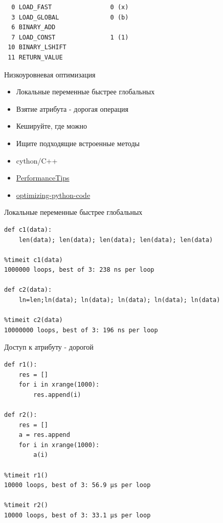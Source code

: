 \documentclass{article}
\begin{document}
\begin{verbatim}
  0 LOAD_FAST                0 (x)
  3 LOAD_GLOBAL              0 (b)
  6 BINARY_ADD          
  7 LOAD_CONST               1 (1)
 10 BINARY_LSHIFT       
 11 RETURN_VALUE   
\end{verbatim}
\newpage 

\begin{center} Низкоуровневая оптимизация \end{center}
\begin{itemize}
    \item Локальные переменные быстрее глобальных
    \item Взятие атрибута - дорогая операция
    \item Кешируйте, где можно
    \item Ищите подходящие встроенные методы
    \item cython/C++
    \item \href{https://wiki.python.org/moin/PythonSpeed/PerformanceTips}{PerformanceTips}
    \item \href{http://stackoverflow.com/questions/7165465/optimizing-python-code}{optimizing-python-code}
\end{itemize}
\newpage 

\begin{center} Локальные переменные быстрее глобальных \end{center}
\begin{verbatim}
def c1(data):                              
    len(data); len(data); len(data); len(data); len(data)

%timeit c1(data)
1000000 loops, best of 3: 238 ns per loop

def c2(data):                              
    ln=len;ln(data); ln(data); ln(data); ln(data); ln(data)

%timeit c2(data)
10000000 loops, best of 3: 196 ns per loop
\end{verbatim}
\newpage 

\begin{center} Доступ к атрибуту - дорогой \end{center}
\begin{verbatim}
def r1():
    res = []
    for i in xrange(1000):
        res.append(i)

def r2():
    res = []
    a = res.append
    for i in xrange(1000):
        a(i)

%timeit r1()
10000 loops, best of 3: 56.9 µs per loop

%timeit r2()
10000 loops, best of 3: 33.1 µs per loop
\end{verbatim}
\newpage 
\end{document}
